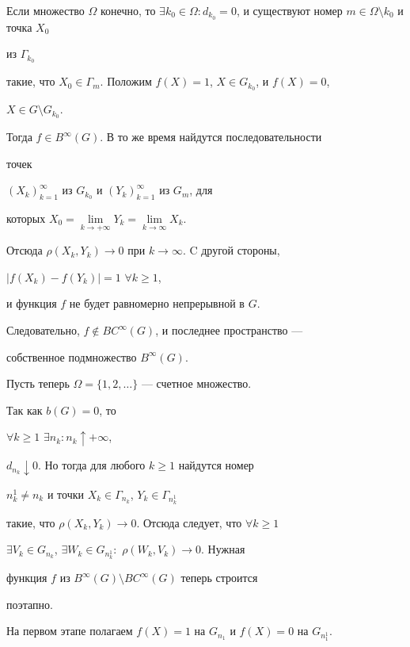 \begin{pf}


Если множество $\Omega$ конечно, то $\exists k_0\in \Omega:


d_{k_0}=0$, и существуют номер $m\in \Omega\setminus k_0$ и точка $X_0$


из $\Gamma_{k_0}$


такие, что $X_0\in \Gamma_m$. Положим $f(X)=1$, $X\in G_{k_0}$, и $f(X)=0$,


$X\in G\setminus G_{k_0}$.


Тогда $f\in B^{\infty}(G)$. В то же время найдутся последовательности


точек


$(X_k)^{\infty}_{k=1}$ из $G_{k_0}$ и $(Y_k)^{\infty}_{k=1}$ из $G_m$, для


которых $X_0=\lim\limits_{k\to +\infty} Y_k=\lim\limits_{k\to \infty}X_k$.


Отсюда $\rho(X_k,Y_k)\to 0$ при $k\to \infty$. C другой стороны,


$|f(X_k)-f(Y_k)|=1$ \; $\forall k \geqslant 1$, 


и функция $f$ не будет равномерно непрерывной в $G$.


Следовательно, $f\notin BC^{\infty}(G)$, и последнее пространство ---


собственное подмножество $B^{\infty}(G)$.





Пусть теперь $\Omega=\{1,2,\dotsc\}$ --- счетное множество.


Так как $b(G)=0$, то 


$\forall k\geqslant 1$ $\exists n_k:n_k\uparrow+\infty$,


$d_{n_k}\downarrow 0$. Но тогда для любого $k\geqslant 1$ найдутся номер


$n_k^1\neq n_k$ и точки $X_k\in\Gamma_{n_k}$, $Y_k\in \Gamma_{n^1_k}$


такие, что $\rho(X_k,Y_k)\to 0$. Отсюда следует, что $\forall k\geqslant 1$


$\exists V_k


\in G_{n_k}$, $\exists W_k \in G_{n^1_k}:$ $\rho(W_k,V_k)\to 0$. Нужная


функция $f$ из $B^{\infty}(G)\setminus BC^{\infty}(G)$ теперь строится


поэтапно.





На первом этапе полагаем $f(X)=1$ на $G_{n_1}$ и $f(X)=0$ на $G_{n^1_1}$.



\end{pf}
